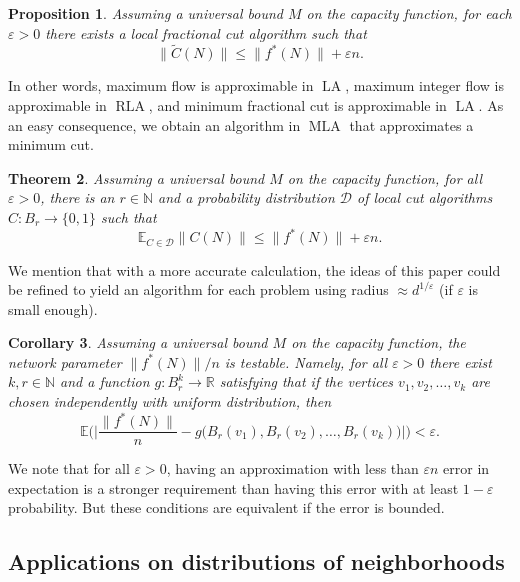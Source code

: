 \documentclass[12pt,a4paper]{article}
\newtheorem{Theorem}{Theorem}
\newtheorem{Corollary}[Theorem]{Corollary}
\newtheorem{Proposition}[Theorem]{Proposition}
\newcommand{\D}{\mathcal{D}}
\newcommand{\eps}{\varepsilon}
\newcommand{\E}{\mathbb{E}}
\newcommand{\N}{\mathbb{N}}
\renewcommand{\:}{\colon}
\DeclareMathOperator{\LA}{LA}
\DeclareMathOperator{\RLA}{RLA}
\DeclareMathOperator{\MLA}{MLA}
\begin{document}
\begin{Proposition} \label{localgfraccut}
Assuming a universal bound $M$ on the capacity function, for each $\eps > 0$ there exists a local fractional cut algorithm such that 
\begin{equation}
\big\|\tilde{C}(N)\big\| \le \|f^*(N)\| + \eps n.
\end{equation} \end{Proposition}

In other words, maximum flow is approximable in $\LA$, maximum integer flow is approximable in $\RLA$, and minimum fractional cut is approximable in $\LA$. 
As an easy consequence, we obtain an algorithm in $\MLA$ that approximates a minimum cut. 

\begin{Theorem} \label{localgcut}
Assuming a universal bound $M$ on the capacity function, for all $\eps > 0$, there is an $r\in \N$ and a probability distribution $\D$ of local cut algorithms $C\: B_r \rightarrow \{0,1\}$ such that 
\begin{equation*}
\E_{C \in \D} \big\|C(N)\big\| \le \big\|f^*(N)\big\| + \eps n.
\end{equation*}
\end{Theorem}

We mention that with a more accurate calculation, the ideas of this paper could be refined to yield an algorithm for each problem using radius $\approx d^{1 / \eps}$ (if $\eps$ is small enough).

\begin{Corollary} \label{testable}
Assuming a universal bound $M$ on the capacity function, the network parameter $\big\|f^*(N)\big\| / n$ is testable. 
Namely, for all $\eps > 0$ there exist $k, r \in \mathbb{N}$ and a function $g\: B_r^k \rightarrow \mathbb{R}$ satisfying that if the vertices $v_1, v_2, \ldots, v_k$ are chosen independently with uniform distribution, then
\begin{equation*}
\E\bigg( \bigg|\frac{\|f^*(N)\|}{n} - g\big(B_r(v_1), B_r(v_2), \ldots, B_r(v_k)\big)\bigg| \bigg) < \eps.
\end{equation*}
\end{Corollary}

We note that for all $\eps > 0$, having an approximation with less than $\eps n$ error in expectation is a stronger requirement than having this error with at least $1 - \eps$ probability. 
But these conditions are equivalent if the error is bounded.


\subsection{Applications on distributions of neighborhoods}\label{subsec:AL}
\end{document}
